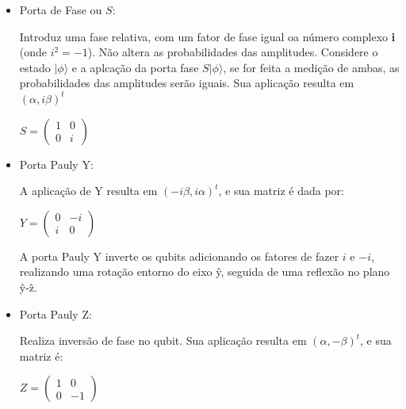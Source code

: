\documentclass[tcc,capa]{texufpel}
\begin{document}
\begin{itemize}
    \item \begin{center} Porta de Fase ou $S$: \cite{chuang00a}
    \end{center}
    
    Introduz uma fase relativa, com um fator de fase igual oa número complexo \textbf{i} (onde $i^2=-1$). Não altera as probabilidades das amplitudes. Considere o estado $|\phi\rangle$  e a aplcação da porta fase $S|\phi\rangle$, se for feita a medição de ambas, as probabilidades das amplitudes serão iguais. Sua aplicação resulta em $(\alpha, i\beta)^t$
    
    \begin{center} 
    $ S=\left( \begin{array}{cc}
        1 & 0 \\
        0 & i
    \end{array}
    \right)
    $
    \end{center}
    \item \begin{center} Porta Pauly Y: \cite{chuang00a}
    \end{center}
    
A aplicação de Y resulta em $(-i \beta,i\alpha)^t$, e sua matriz é dada por:    
    
    \begin{center} $Y = \left( \begin{array}{cc}
        0 & -i \\
        i & 0
    \end{array}
    \right)$
\end{center}
A porta Pauly Y inverte os qubits adicionando os fatores de fazer $i$ e $-i$, realizando uma rotação entorno do eixo \^{y}, seguida de uma reflexão no plano \^{y}-\^{z}.

   \item \begin{center} Porta Pauly Z: \cite{chuang00a}
\end{center}
Realiza inversão de fase no qubit. Sua aplicação resulta em $(\alpha, -\beta)^t$, e sua matriz é:


\begin{center}
    
 $ Z= \left( \begin{array}{cc}
    1 & 0 \\
    0 & -1
\end{array}
\right)$
\end{center}


\end{itemize}
\end{document}
